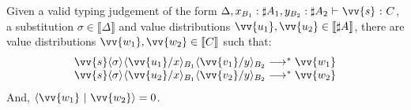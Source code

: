 \documentclass[runningheads,orivec,envcountsame,envcountsect]{llncs}
\newcommand\lra{\longrightarrow}
\newcommand\ansubst[2]{\ensuremath{\langle #1 \rangle_{#2}}}
\def\scal#1#2{\langle{#1}~|~{#2}\rangle}
\def\eval{\lra^*}
\def\sem#1{\llbracket#1\rrbracket}
\def\TYP#1#2#3{#1~{\vdash}~#2~{:}~#3}
\begin{document}
\begin{lemma}\label{lem:OrthogonalSubstitution} %
Given a valid typing judgement of the form $\TYP{\Delta, x_{B_1}:\sharp A_1, y_{B_2}: \sharp A_2}{\vv{s}}{C}$, a substitution $\sigma\in\sem{\Delta}$ and value distributions $\vv{u_1},\vv{u_2}\in\sem{\sharp A}$, there are value distributions $\vv{w_1},\vv{w_2}\in\sem{C}$ such that:
\[
\begin{array}{c}
    \vv{s}\ansubst{\sigma}{}\ansubst{\vv{u_1}/x}{B_1}{\ansubst{\vv{v_1}/y}{B_2}}\eval\vv{w_1}\\
    \vv{s}\ansubst{\sigma}{}\ansubst{\vv{u_2}/x}{B_1}{\ansubst{\vv{v_2}/y}{B_2}}\eval\vv{w_2}\\
\end{array}
\]
And, $\scal{\vv{w_1}}{\vv{w_2}} = 0$.
\end{lemma}
\end{document}
